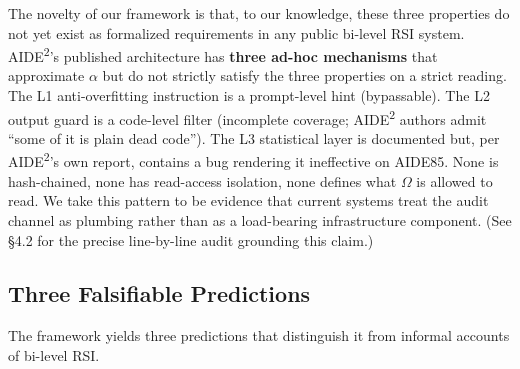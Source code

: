 \documentclass{article}
\theoremstyle{definition}
\begin{document}
The novelty of our framework is that, to our knowledge, these three properties do not yet exist as formalized requirements in any public bi-level RSI system. AIDE\textsuperscript{2}'s published architecture has \textbf{three ad-hoc mechanisms} that approximate $\alpha$ but do not strictly satisfy the three properties on a strict reading. The L1 anti-overfitting instruction is a prompt-level hint (bypassable). The L2 output guard is a code-level filter (incomplete coverage; AIDE\textsuperscript{2} authors admit ``some of it is plain dead code''). The L3 statistical layer is documented but, per AIDE\textsuperscript{2}'s own report, contains a bug rendering it ineffective on AIDE85. None is hash-chained, none has read-access isolation, none defines what $\Omega$ is allowed to read. We take this pattern to be evidence that current systems treat the audit channel as plumbing rather than as a load-bearing infrastructure component. (See \S4.2 for the precise line-by-line audit grounding this claim.)

\subsection{Three Falsifiable Predictions}

The framework yields three predictions that distinguish it from informal accounts of bi-level RSI.
\end{document}
